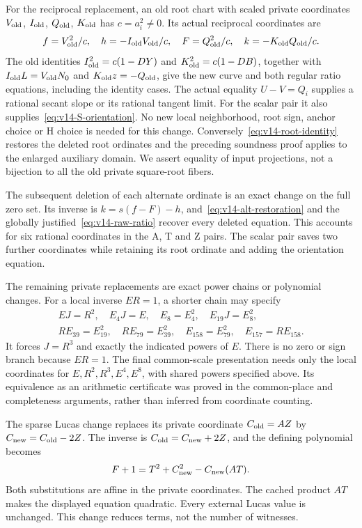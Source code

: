 For the reciprocal replacement, an old root chart with
scaled private coordinates $V_{\rm old}$, $I_{\rm old}$,
$Q_{\rm old}$, $K_{\rm old}$ has $c=a_i^2\ne0$.
Its actual reciprocal coordinates are
\[
 f=V_{\rm old}^2/c,\quad
 h=-I_{\rm old}V_{\rm old}/c,\quad
 F=Q_{\rm old}^2/c,\quad
 k=-K_{\rm old}Q_{\rm old}/c.
\]
The old identities $I_{\rm old}^2=c(1-DY)$ and
$K_{\rm old}^2=c(1-DB)$, together with
$I_{\rm old}L=V_{\rm old}N_0$ and
$K_{\rm old}z=-Q_{\rm old}$, give the new curve and both
regular ratio equations, including the identity cases.
The actual equality $U-V=Q_i$ supplies a rational secant
slope or its rational tangent limit. For the scalar pair it
also supplies~\eqref{eq:v14-S-orientation}.
No new local neighborhood, root sign, anchor choice or H
choice is needed for this change.
Conversely~\eqref{eq:v14-root-identity} restores the deleted
root ordinates and the preceding soundness proof applies to
the enlarged auxiliary domain. We assert equality of input
projections, not a bijection to all the old private
square-root fibers.

The subsequent deletion of each alternate ordinate is an
exact change on the full zero set. Its inverse is
$k=s(f-F)-h$, and~\eqref{eq:v14-alt-restoration} and the
globally justified~\eqref{eq:v14-raw-ratio} recover every
deleted equation. This accounts for six rational coordinates
in the A, T and Z pairs. The scalar pair saves two further
coordinates while retaining its root ordinate and adding
the orientation equation.

The remaining private replacements are exact power chains
or polynomial changes. For a local inverse $ER=1$, a shorter
chain may specify
\[
\begin{gathered}
 EJ=R^2,\quad E_4J=E,\quad E_8=E_4^2,\quad E_{19}J=E_8^2,\\
 RE_{39}=E_{19}^2,\quad RE_{79}=E_{39}^2,\quad
 E_{158}=E_{79}^2,\quad E_{157}=RE_{158}.
\end{gathered}
\]
It forces $J=R^3$ and exactly the indicated powers of $E$.
There is no zero or sign branch because $ER=1$.
The final common-scale presentation needs only the local
coordinates for $E,R^2,R^3,E^4,E^8$, with shared powers
specified above. Its equivalence as an arithmetic
certificate was proved in the common-place and completeness
arguments, rather than inferred from coordinate counting.

The sparse Lucas change replaces its private coordinate
$C_{\rm old}=AZ$ by $C_{\rm new}=C_{\rm old}-2Z$.
The inverse is $C_{\rm old}=C_{\rm new}+2Z$, and the defining
polynomial becomes
\[
 F+1=T^2+C_{\rm new}^2-C_{\rm new}(AT).
\]
Both substitutions are affine in the private coordinates.
The cached product $AT$ makes the displayed equation
quadratic. Every external Lucas value is unchanged.
This change reduces terms, not the number of witnesses.

